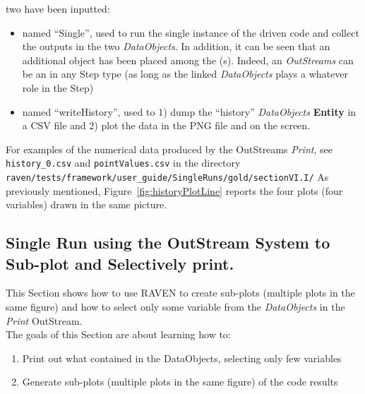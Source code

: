 \begin{enumerate}
   two  have been inputted:
   \begin{itemize}
     \item {} named ``Single'', used to run the single instance of the driven code and collect
     the outputs in the two \textit{DataObjects}. In addition, it can be seen that an additional object has been
     placed among the (s). Indeed, an  \textit{OutStreams} can be an  in
     any Step type (as long as the linked \textit{DataObjects} plays a whatever role in the Step)
     \item  {} named ``writeHistory'', used to 1) dump the ``history'' \textit{DataObjects}
     \textbf{Entity} in a CSV file and 2) plot the data in the PNG file and on the screen.
   \end{itemize}
\end{enumerate}
For examples of the numerical data produced by the OutStreams \textit{Print}, see \texttt{history\_0.csv} and
\texttt{pointValues.csv} in the directory
 \texttt{raven/tests/framework/user\_guide/SingleRuns/gold/sectionVI.I/}
 As previously mentioned, Figure~\ref{fig:historyPlotLine} reports the four plots (four variables) drawn in the same picture.

\subsection{Single Run using the OutStream System to Sub-plot and Selectively print.}
This Section shows how to use RAVEN to create sub-plots (multiple plots in the same figure) and
how to select only some variable from the \textit{DataObjects} in the \textit{Print} OutStream.
 \\ The goals of this Section are about learning how to:
 \begin{enumerate}
   \item Print out what contained in the DataObjects, selecting only few variables
   \item Generate sub-plots (multiple plots in the same figure) of the code results
\end{enumerate}

